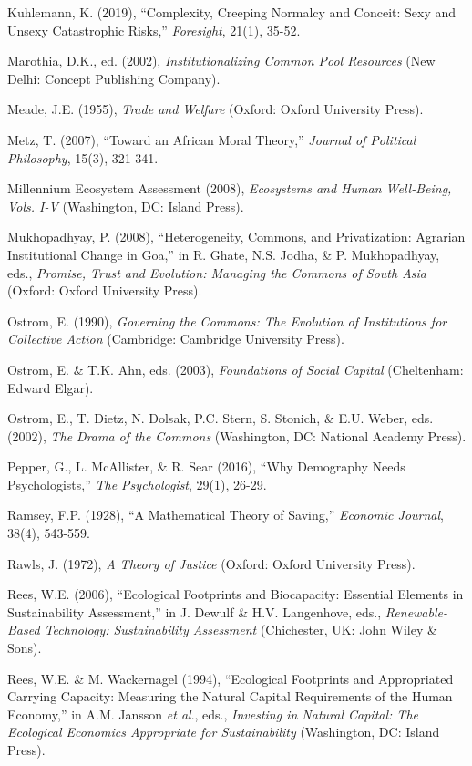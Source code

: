 \documentclass[man,11pt,a4paper,floatsintext]{apa7}
\begin{document}
\begin{list}{}{\setlength{\leftmargin}{0.5in}\setlength{\itemindent}{-0.5in}\setlength{\itemsep}{0pt}\setlength{\parsep}{0pt}}
\item Kuhlemann, K. (2019), ``Complexity, Creeping Normalcy and Conceit: Sexy and Unsexy Catastrophic Risks,'' \textit{Foresight}, 21(1), 35-52.
\item Marothia, D.K., ed. (2002), \textit{Institutionalizing Common Pool Resources} (New Delhi: Concept Publishing Company).
\item Meade, J.E. (1955), \textit{Trade and Welfare} (Oxford: Oxford University Press).
\item Metz, T. (2007), ``Toward an African Moral Theory,'' \textit{Journal of Political Philosophy}, 15(3), 321-341.
\item Millennium Ecosystem Assessment (2008), \textit{Ecosystems and Human Well-Being, Vols. I-V} (Washington, DC: Island Press).
\item Mukhopadhyay, P. (2008), ``Heterogeneity, Commons, and Privatization: Agrarian Institutional Change in Goa,'' in R. Ghate, N.S. Jodha, \& P. Mukhopadhyay, eds., \textit{Promise, Trust and Evolution: Managing the Commons of South Asia} (Oxford: Oxford University Press).
\item Ostrom, E. (1990), \textit{Governing the Commons: The Evolution of Institutions for Collective Action} (Cambridge: Cambridge University Press).
\item Ostrom, E. \& T.K. Ahn, eds. (2003), \textit{Foundations of Social Capital} (Cheltenham: Edward Elgar).
\item Ostrom, E., T. Dietz, N. Dolsak, P.C. Stern, S. Stonich, \& E.U. Weber, eds. (2002), \textit{The Drama of the Commons} (Washington, DC: National Academy Press).
\item Pepper, G., L. McAllister, \& R. Sear (2016), ``Why Demography Needs Psychologists,'' \textit{The Psychologist}, 29(1), 26-29.
\item Ramsey, F.P. (1928), ``A Mathematical Theory of Saving,'' \textit{Economic Journal}, 38(4), 543-559.
\item Rawls, J. (1972), \textit{A Theory of Justice} (Oxford: Oxford University Press).
\item Rees, W.E. (2006), ``Ecological Footprints and Biocapacity: Essential Elements in Sustainability Assessment,'' in J. Dewulf \& H.V. Langenhove, eds., \textit{Renewable-Based Technology: Sustainability Assessment} (Chichester, UK: John Wiley \& Sons).
\item Rees, W.E. \& M. Wackernagel (1994), ``Ecological Footprints and Appropriated Carrying Capacity: Measuring the Natural Capital Requirements of the Human Economy,'' in A.M. Jansson \textit{et al}., eds., \textit{Investing in Natural Capital: The Ecological Economics Appropriate for Sustainability} (Washington, DC: Island Press).

\end{list}
\end{document}
